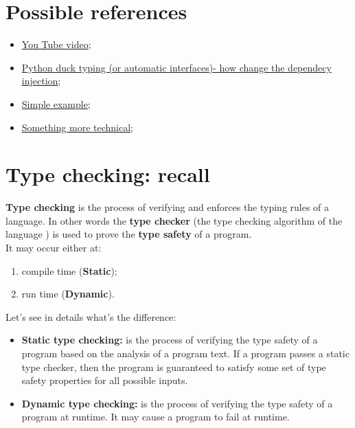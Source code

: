 \documentclass[12pt]{article}
\begin{document}
\maketitle
\tableofcontents
\listoftables
\listoffigures

\section{Possible references}
	\begin{itemize}
		\item \href{https://www.youtube.com/watch?v=fK5lcaNqdj4}{You Tube video};
		\item \href{https://hackernoon.com/python-duck-typing-or-automatic-interfaces-73988ec9037f}{Python duck typing (or automatic interfaces)- how change the dependecy injection};
		\item \href{https://medium.com/programming-hacks/duck-typing-in-python-6740aa72b301}{Simple example};
		\item \href{http://www.voidspace.org.uk/python/articles/duck_typing.shtml}{Something more technical};
	\end{itemize}
	
\section{Type checking: recall }
	
		\textbf{Type checking} is the process of verifying and enforces the typing rules of a language. In other words the \textbf{type checker} (the type checking algorithm of the language ) is used to prove the \textbf{type safety} of a program.\\
		It may occur either at:
		
		\begin{enumerate}
			\item compile time (\textbf{Static});
			\item run time (\textbf{Dynamic}). 
		\end{enumerate}
	
		Let's see in details what's the difference:	
		
		\begin{itemize}
			\item \textbf{Static type checking: }is the process of verifying the type safety of a program based on the analysis of a program text.  If a program passes a static type checker, then the program is guaranteed to satisfy some set of type safety properties for all possible inputs.
			\item \textbf{Dynamic type checking:} is the process of verifying the type safety of a program at runtime. It may cause a program to fail at runtime.
		\end{itemize}
	
\end{document}
